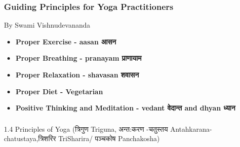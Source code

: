 \begin{frame}[fragile]\frametitle{Guiding Principles for Yoga Practitioners}

By Swami Vishnudevananda

    \begin{itemize}
        \item \textbf{Proper Exercise - aasan आसन}
            
            
        \item \textbf{Proper Breathing - pranayam प्राणायाम}
            
            
        \item \textbf{Proper Relaxation - shavasan  शवासन }
            
            
        \item \textbf{Proper Diet - Vegetarian}
            
            
        \item \textbf{Positive Thinking and Meditation - vedant  वेदान्त  and dhyan ध्यान }
            
            
    \end{itemize}
\end{frame}


\begin{frame}[fragile]\frametitle{}
\begin{center}
{\Large 1.4 Principles of Yoga (त्रिगुण Triguna, अन्त:करण -चतुस्तय Antahkarana-chatustaya,त्रिशरिर  TriSharira/  पञ्चकोष Panchakosha)}
\end{center}
\end{frame}

